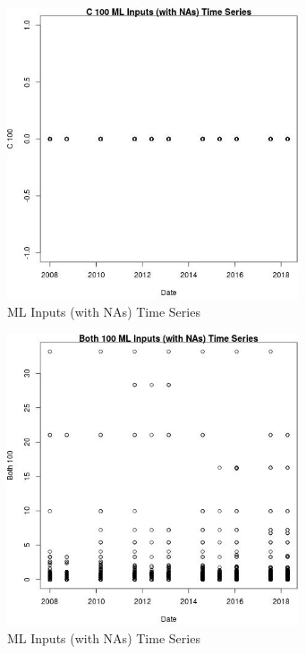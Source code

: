 \begin{figure} 
\centering  
\includegraphics[width=0.77\textwidth]{Code_Outputs/Report_ML_input_PM25_Step4_part_e_de_duplicated_aves_compiled_2019-05-18wNAs_C_100vDate.jpg} 
\caption{\label{fig:Report_ML_input_PM25_Step4_part_e_de_duplicated_aves_compiled_2019-05-18wNAsC_100vDate}ML Inputs (with NAs) Time Series} 
\end{figure} 
 

\begin{figure} 
\centering  
\includegraphics[width=0.77\textwidth]{Code_Outputs/Report_ML_input_PM25_Step4_part_e_de_duplicated_aves_compiled_2019-05-18wNAs_Both_100vDate.jpg} 
\caption{\label{fig:Report_ML_input_PM25_Step4_part_e_de_duplicated_aves_compiled_2019-05-18wNAsBoth_100vDate}ML Inputs (with NAs) Time Series} 
\end{figure} 
 

